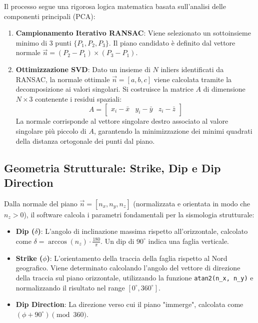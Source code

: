 \documentclass[12pt,a4paper]{article}
\begin{document}
Il processo segue una rigorosa logica matematica basata sull'analisi delle componenti principali (PCA):
\begin{enumerate}
    \item \textbf{Campionamento Iterativo RANSAC}: Viene selezionato un sottoinsieme minimo di 3 punti $\{P_1, P_2, P_3\}$. Il piano candidato è definito dal vettore normale $\vec{n} = (P_2 - P_1) \times (P_3 - P_1)$.
    \item \textbf{Ottimizzazione SVD}: Dato un insieme di $N$ inliers identificati da RANSAC, la normale ottimale $\vec{n} = [a, b, c]$ viene calcolata tramite la decomposizione ai valori singolari. Si costruisce la matrice $A$ di dimensione $N \times 3$ contenente i residui spaziali:
    \begin{equation}
        A = \begin{bmatrix} x_i - \bar{x} & y_i - \bar{y} & z_i - \bar{z} \end{bmatrix}
    \end{equation}
    La normale corrisponde al vettore singolare destro associato al valore singolare più piccolo di $A$, garantendo la minimizzazione dei minimi quadrati della distanza ortogonale dei punti dal piano.
\end{enumerate}

\subsection{Geometria Strutturale: Strike, Dip e Dip Direction}
Dalla normale del piano $\vec{n} = [n_x, n_y, n_z]$ (normalizzata e orientata in modo che $n_z > 0$), il software calcola i parametri fondamentali per la sismologia strutturale:
\begin{itemize}
    \item \textbf{Dip ($\delta$)}: L'angolo di inclinazione massima rispetto all'orizzontale, calcolato come $\delta = \arccos(n_z) \cdot \frac{180}{\pi}$. Un dip di $90^\circ$ indica una faglia verticale.
    \item \textbf{Strike ($\phi$)}: L'orientamento della traccia della faglia rispetto al Nord geografico. Viene determinato calcolando l'angolo del vettore di direzione della traccia sul piano orizzontale, utilizzando la funzione \texttt{atan2(n\_x, n\_y)} e normalizzando il risultato nel range $[0^\circ, 360^\circ]$.
    \item \textbf{Dip Direction}: La direzione verso cui il piano "immerge", calcolata come $(\phi + 90^\circ) \pmod{360}$.
\end{itemize}
\end{document}
